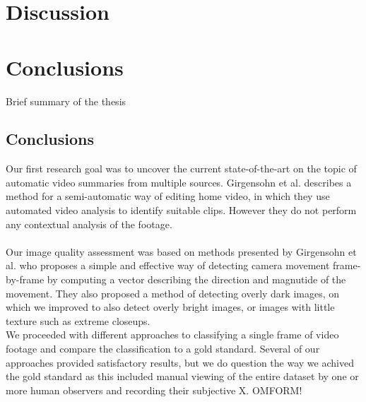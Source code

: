 \chapter{Discussion}
%
%
\chapter{Conclusions}
%
%
Brief summary of the thesis
%
\section{Conclusions}\label{sec:conc_concs}
%
Our first research goal was to uncover the current state-of-the-art on the topic of automatic video summaries from multiple sources. Girgensohn et al.\cite{Girgensohn:2000:SAH:354401.354415} describes a method for a semi-automatic way of editing home video, in which they use automated video analysis to identify suitable clips. However they do not perform any contextual analysis of the footage.
\\\\
Our image quality assessment was based on methods presented by Girgensohn et al.\cite{Girgensohn:2000:SAH:354401.354415} who proposes a simple and effective way of detecting camera movement frame-by-frame by computing a vector describing the direction and magnutide of the movement. They also proposed a method of detecting overly dark images, on which we improved to also detect overly bright images, or images with little texture such as extreme closeups.\\
We proceeded with different approaches to classifying a single frame of video footage and compare the classification to a gold standard. Several of our approaches provided satisfactory results, but we do question the way we achived the gold standard as this included manual viewing of the entire dataset by one or more human observers and recording their subjective X. OMFORM!\\
